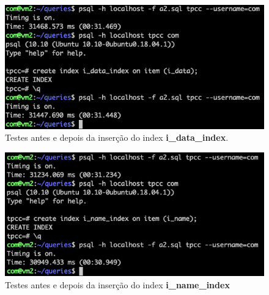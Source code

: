 \begin{figure}[H]
    \centering
    \includegraphics[scale=0.5]{imagens/a2-1.png}
     \caption{Testes antes e depois da inserção do index \textbf{i\_data\_index}.}
    \label{fig:exemplo}
\end{figure}

\begin{figure}[H]
    \centering
    \includegraphics[scale=0.5]{imagens/a2-2.png}
     \caption{Testes antes e depois da inserção do index \textbf{i\_name\_index}}
    \label{fig:exemplo}
\end{figure}